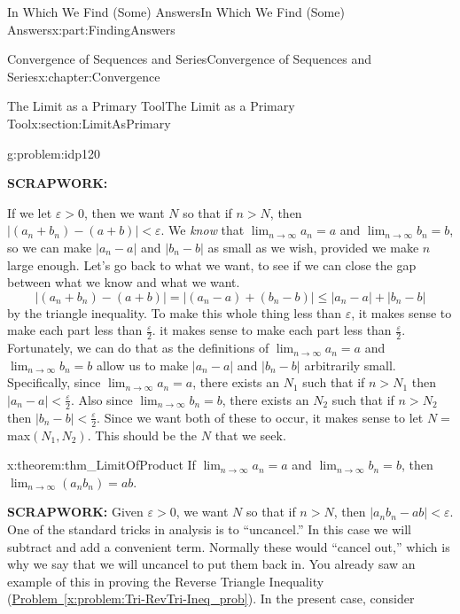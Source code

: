 \documentclass[oneside,10pt,]{book}
\newcommand{\xreffont}{\relax}
\newcommand{\terminology}[1]{\textbf{#1}}
\numberwithin{equation}{section}
\def\limit#1#2#3{{\displaystyle\lim_{#1\rightarrow #2}#3}}
\newcommand{\eps}{\varepsilon}
\newcommand{\lt}{<}
\begin{document}
\begin{partptx}{In Which We Find (Some) Answers}{}{In Which We Find (Some) Answers}{}{}{x:part:FindingAnswers}
\begin{chapterptx}{Convergence of Sequences and Series}{}{Convergence of Sequences and Series}{}{}{x:chapter:Convergence}
\begin{sectionptx}{The Limit as a Primary Tool}{}{The Limit as a Primary Tool}{}{}{x:section:LimitAsPrimary}
\begin{problem}{}{g:problem:idp120}
\par
\terminology{SCRAPWORK:}%
\par
If we let \(\eps>0\), then we want \(N\) so that if \(n>N\), then \(\big|\left(a_n+b_n\right)-\left(a+b\right)\big|\lt \eps\). We \emph{know} that \(\limit{n}{\infty}{a_n}=a\) and \(\limit{n}{\infty}{b_n}=b\), so we can make \(\big|a_n-a\big|\) and  \(\big|b_n-b\big|\) as small as we wish, provided we make \(n\) large enough. Let's go back to what we want, to see if we can close the gap between what we know and what we want.%
\begin{equation*}
\left|\left(a_n+b_n\right)-\left(a+b\right)\right|=\left|\left(a_n-a\right)+\left(b_n-b\right)\right|\leq\left|a_n-a\right|+\left|b_n-b\right|
\end{equation*}
by the triangle inequality. To make this whole thing less than \(\eps\), it makes sense to make each part less than \(\frac{\eps}{2}\). it makes sense to make each part less than \(\frac{\eps}{2}\). Fortunately, we can do that as the definitions of \(\limit{n}{\infty}{a_n}=a\) and \(\limit{n}{\infty}{b_n}=b\) allow us to make \(\big|a_n-a\big|\) and \(\big|b_n-b\big|\) arbitrarily small. Specifically, since \(\limit{n}{\infty}{a_n}=a\), there exists an \(N_1\) such that if \(n>N_1\) then \(\big|a_n-a\big|\lt \frac{\eps}{2}\). Also since \(\limit{n}{\infty}{b_n}=b\), there exists an \(N_2\) such that if \(n>N_2\) then \(\big|b_n-b\big|\lt \frac{\eps}{2}\). Since we want both of these to occur, it makes sense to let \(N=\)max\(\left(N_1,N_2\right)\). This should be the \(N\) that we seek.%
\end{problem}
\begin{theorem}{}{}{x:theorem:thm_LimitOfProduct}%
 If \(\displaystyle\lim_{n\rightarrow\infty}a_n=a\) and \(\displaystyle\lim_{n\rightarrow\infty}b_n=b\), then \(\displaystyle\lim_{n\rightarrow\infty}\left(a_n b_n\right)=a b\).%
\end{theorem}
\terminology{SCRAPWORK:} Given \(\eps>0\), we want \(N\) so that if \(n>N\), then \(\big|a_n  b_n-a  b\big|\lt \eps\). One of the standard tricks in analysis is to ``uncancel.'' In this case we will subtract and add a convenient term. Normally these would ``cancel out,'' which is why we say that we will uncancel to put them back in. You already saw an example of this in proving the Reverse Triangle Inequality (\hyperref[x:problem:Tri-RevTri-Ineq_prob]{Problem~{\xreffont\ref{x:problem:Tri-RevTri-Ineq_prob}}}). In the present case, consider%
\begin{align*}

\end{align*}
\end{sectionptx}
\end{chapterptx}
\end{partptx}
\end{document}
